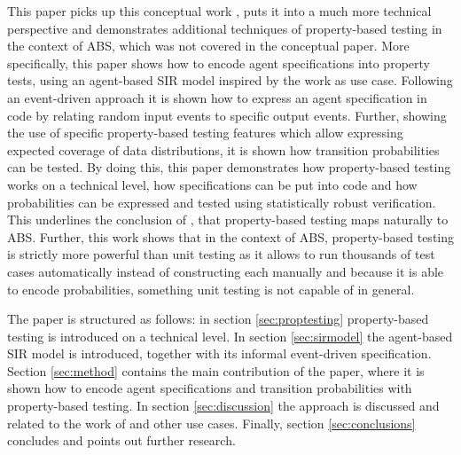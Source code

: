 This paper picks up this conceptual work \cite{thaler_show_2019}, puts it into a much more technical perspective and demonstrates additional techniques of property-based testing in the context of ABS, which was not covered in the conceptual paper. More specifically, this paper shows how to encode agent specifications into property tests, using an agent-based SIR model inspired by the work \cite{macal_agent-based_2010} as use case. Following an event-driven approach it is shown how to express an agent specification in code by relating random input events to specific output events. Further, showing the use of specific property-based testing features which allow expressing expected coverage of data distributions, it is shown how transition probabilities can be tested. By doing this, this paper demonstrates how property-based testing works on a technical level, how specifications can be put into code and how probabilities can be expressed and tested using statistically robust verification. This underlines the conclusion of \cite{thaler_show_2019}, that property-based testing maps naturally to ABS. Further, this work shows that in the context of ABS, property-based testing is strictly more powerful than unit testing as it allows to run thousands of test cases automatically instead of constructing each manually and because it is able to encode probabilities, something unit testing is not capable of in general.

The paper is structured as follows: in section \ref{sec:proptesting} property-based testing is introduced on a technical level. In section \ref{sec:sirmodel} the agent-based SIR model is introduced, together with its informal event-driven specification. Section \ref{sec:method} contains the main contribution of the paper, where it is shown how to encode agent specifications and transition probabilities with property-based testing. In section \ref{sec:discussion} the approach is discussed and related to the work of \cite{thaler_show_2019} and other use cases. Finally, section \ref{sec:conclusions} concludes and points out further research.
